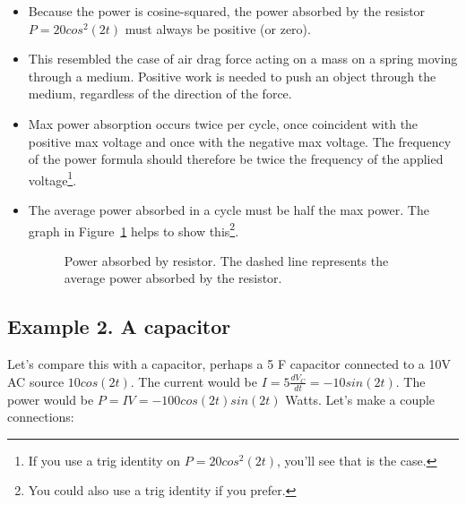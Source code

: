 \begin{itemize}
\item Because the power is cosine-squared, the power absorbed by the resistor $P=20cos^2(2t)$ must always be positive (or zero).
\item This resembled the case of air drag force acting on a mass on a spring moving through a medium. Positive work is needed to push an object through the medium, regardless of the direction of the force.
\item Max power absorption occurs twice per cycle, once coincident with the positive max voltage and once with the negative max voltage. The frequency of the power formula should therefore be twice the frequency of the applied voltage\footnote{If you use a trig identity on $P=20cos^2(2t)$, you'll see that is the case.}.
\item The average power absorbed in a cycle must be half the max power.  The graph in Figure~\ref{F:8POW} helps to show this\footnote{You could also use a trig identity if you prefer.}.

\begin{figure}[H]
\begin{center}
\caption{Power absorbed by resistor. The dashed line represents the average power absorbed by the resistor.}
\end{center}
\label{F:8POW}
\end{figure}

\end{itemize}

\subsection{Example 2. A capacitor}
Let's compare this with a capacitor, perhaps a 5 F capacitor connected to a 10V AC source $10cos(2t)$. The current would be $I=5\frac{dV_C}{dt}=-10sin(2t)$. The power would be $P=IV=-100cos(2t)sin(2t)$ Watts. Let's make a couple connections:

